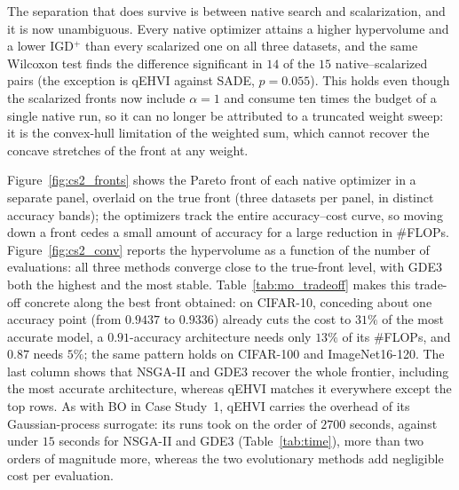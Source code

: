\documentclass[runningheads]{llncs}
\begin{document}
The separation that does survive is between native search and scalarization, and it is now unambiguous. Every native optimizer attains a higher hypervolume and a lower IGD$^{+}$ than every scalarized one on all three datasets, and the same Wilcoxon test finds the difference significant in $14$ of the $15$ native--scalarized pairs (the exception is qEHVI against SADE, $p = 0.055$). This holds even though the scalarized fronts now include $\alpha=1$ and consume ten times the budget of a single native run, so it can no longer be attributed to a truncated weight sweep: it is the convex-hull limitation of the weighted sum, which cannot recover the concave stretches of the front at any weight.

Figure~\ref{fig:cs2_fronts} shows the Pareto front of each native optimizer in a separate panel, overlaid on the true front (three datasets per panel, in distinct accuracy bands); the optimizers track the entire accuracy--cost curve, so moving down a front cedes a small amount of accuracy for a large reduction in \#FLOPs. Figure~\ref{fig:cs2_conv} reports the hypervolume as a function of the number of evaluations: all three methods converge close to the true-front level, with GDE3 both the highest and the most stable. Table~\ref{tab:mo_tradeoff} makes this trade-off concrete along the best front obtained: on CIFAR-10, conceding about one accuracy point (from $0.9437$ to $0.9336$) already cuts the cost to $31\%$ of the most accurate model, a $0.91$-accuracy architecture needs only $13\%$ of its \#FLOPs, and $0.87$ needs $5\%$; the same pattern holds on CIFAR-100 and ImageNet16-120. The last column shows that NSGA-II and GDE3 recover the whole frontier, including the most accurate architecture, whereas qEHVI matches it everywhere except the top rows. As with BO in Case Study~1, qEHVI carries the overhead of its Gaussian-process surrogate: its runs took on the order of $2700$ seconds, against under $15$ seconds for NSGA-II and GDE3 (Table~\ref{tab:time}), more than two orders of magnitude more, whereas the two evolutionary methods add negligible cost per evaluation.
\end{document}
